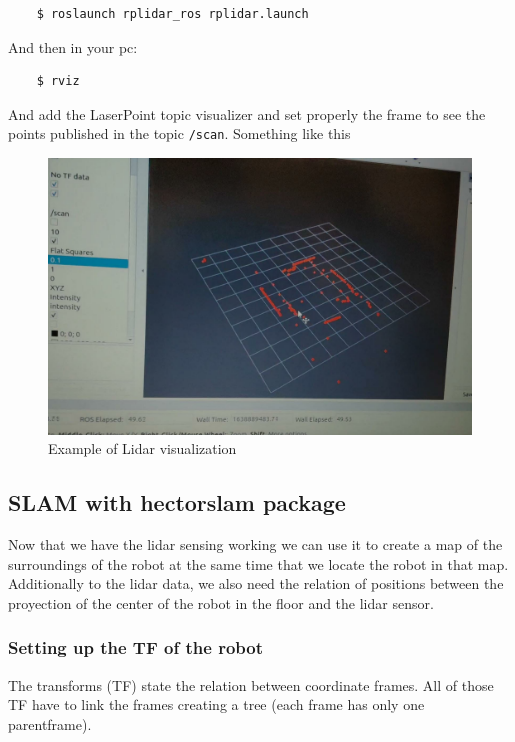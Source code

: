 \documentclass{article}
\begin{document}
\begin{verbatim}
    $ roslaunch rplidar_ros rplidar.launch
\end{verbatim}

And then in your pc:
\begin{verbatim}
    $ rviz
\end{verbatim}
And add the LaserPoint topic visualizer and set properly the frame to see the points published in the topic \verb|/scan|. Something like this

\begin{figure}[H]
    \centering
    \includegraphics[scale=0.2]{laser.jpeg}
    \caption{Example of Lidar visualization}
    \label{fig:lidar_viz}
\end{figure}

\subsection{SLAM with hector\textunderscore slam package}

 Now that we have the lidar sensing working we can use it to create a map of the surroundings of the robot at the same time that we locate the robot in that map. Additionally to the lidar data, we also need the relation of positions between the proyection of the center of the robot in the floor and the lidar sensor.
 
 \subsubsection{Setting up the TF of the robot}
 
 The transforms (TF) state the relation between coordinate frames. All of those TF have to link the frames creating a tree (each frame has only one parentframe). 
 
\end{document}
